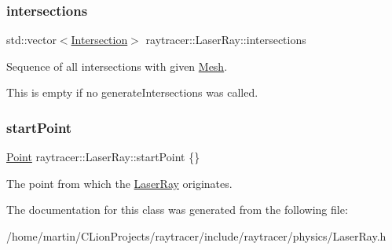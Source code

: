 \subsubsection{\texorpdfstring{intersections}{intersections}}
{\footnotesize\ttfamily std\+::vector$<$\hyperlink{structraytracer_1_1Intersection}{Intersection}$>$ raytracer\+::\+Laser\+Ray\+::intersections}



Sequence of all intersections with given \hyperlink{classraytracer_1_1Mesh}{Mesh}. 

This is empty if no generate\+Intersections was called. \mbox{\label{classraytracer_1_1LaserRay_a6970072ba9bbe9a958d9595386d39cc9}} 
\subsubsection{\texorpdfstring{start\+Point}{startPoint}}
{\footnotesize\ttfamily \hyperlink{classraytracer_1_1Point}{Point} raytracer\+::\+Laser\+Ray\+::start\+Point \{\}}



The point from which the \hyperlink{classraytracer_1_1LaserRay}{Laser\+Ray} originates. 



The documentation for this class was generated from the following file\+:\begin{DoxyCompactItemize}
\item 
/home/martin/\+C\+Lion\+Projects/raytracer/include/raytracer/physics/Laser\+Ray.\+h\end{DoxyCompactItemize}
